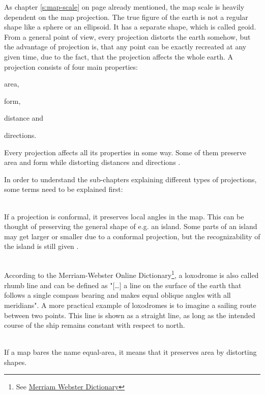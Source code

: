 As chapter \ref{s:map-scale} on page \pageref{s:map-scale} already mentioned, the map scale is heavily dependent on the map projection. The true figure of the earth is not a regular shape like a sphere or an ellipsoid. It has a separate shape, which is called geoid.
From a general point of view, every projection distorts the earth somehow, but the advantage of projection is, that any point can be exactly recreated at any given time, due to the fact, that the projection affects the whole earth.
A projection consists of four main properties:
\begin{enumerate*}
\item area,
\item form,
\item distance and
\item directions.
\end{enumerate*}
Every projection affects all its properties in some way. Some of them preserve area and form while distorting distances and directions .

In order to understand the sub-chapters explaining different types of projections, some terms need to be explained first:

\begin{enumerate}

 \hfill \\
If a projection is conformal, it preserves local angles in the map. This can be thought of preserving the general shape of e.g. an island. Some parts of an island may get larger or smaller due to a conformal projection, but the recognizability of the island is still given .

 \hfill \\
According to the Merriam-Webster Online Dictionary\footnote{See \href{http://www.merriam-webster.com/}{Merriam Webster Dictionary}}, a loxodrome is also called rhumb line and can be defined as "[\ldots] a line on the surface of the earth that follows a single compass bearing and makes equal oblique angles with all meridians". A more practical example of loxodromes is to imagine a sailing route between two points. This line is shown as a straight line, as long as the intended course of the ship remains constant with respect to north.

 \hfill \\
If a map bares the name equal-area, it means that it preserves area by distorting shapes.

\end{enumerate}

